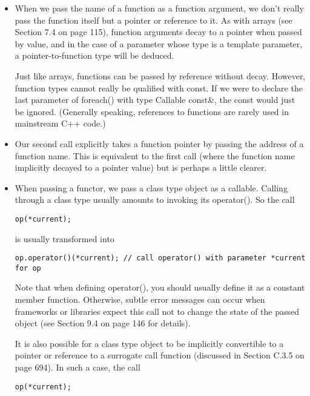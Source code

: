 \begin{itemize}
\item 
When we pass the name of a function as a function argument, we don’t really pass the function itself but a pointer or reference to it. As with arrays (see Section 7.4 on page 115), function arguments decay to a pointer when passed by value, and in the case of a parameter whose type is a template parameter, a pointer-to-function type will be deduced.

Just like arrays, functions can be passed by reference without decay. However, function types cannot really be qualified with const. If we were to declare the last parameter of foreach() with type Callable const\&, the const would just be ignored. (Generally speaking, references to functions are rarely used in mainstream C++ code.)

\item 
Our second call explicitly takes a function pointer by passing the address of a function name. This is equivalent to the first call (where the function name implicitly decayed to a pointer value) but is perhaps a little clearer.

\item 
When passing a functor, we pass a class type object as a callable. Calling through a class type usually amounts to invoking its operator(). So the call

\begin{lstlisting}[style=styleCXX]
op(*current);
\end{lstlisting}

is usually transformed into

\begin{lstlisting}[style=styleCXX]
op.operator()(*current); // call operator() with parameter *current for op
\end{lstlisting}

Note that when defining operator(), you should usually define it as a constant member function. Otherwise, subtle error messages can occur when frameworks or libraries expect this call not to change the state of the passed object (see Section 9.4 on page 146 for details).

It is also possible for a class type object to be implicitly convertible to a pointer or reference to a surrogate call function (discussed in Section C.3.5 on page 694). In such a case, the call

\begin{lstlisting}[style=styleCXX]
op(*current);
\end{lstlisting}


\end{itemize}
